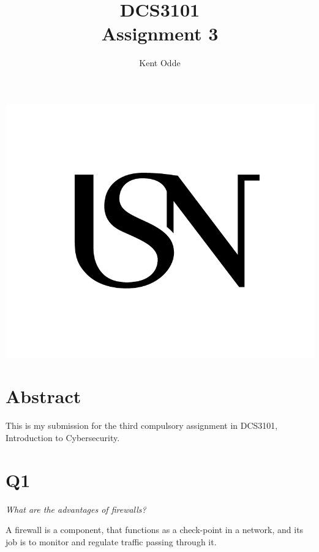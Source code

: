 \documentclass{article}
\begin{document}
\author{Kent Odde}
\title{DCS3101\\Assignment 3}

\maketitle
\thispagestyle{empty}
\begin{center}
\includegraphics[width=\linewidth,height=0.2\textheight,keepaspectratio]{img/USN.png}
\end{center}
\newpage

\tableofcontents

\newpage

\section{Abstract}

This is my submission for the third compulsory assignment in DCS3101, Introduction to Cybersecurity.




\section{Q1}
\begin{tcolorbox}\textit{What are the advantages of firewalls?}\end{tcolorbox}
A firewall is a component, that functions as a check-point in a network, and its job is to monitor and regulate traffic passing through it.
\end{document}

